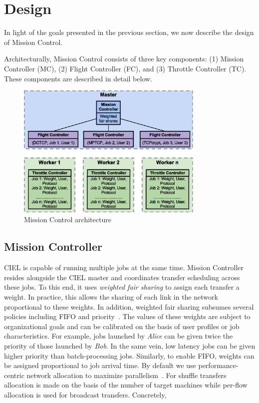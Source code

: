 \documentclass[a4paper,12pt,twoside,openright]{report}
\begin{document}
\section{Design}
In light of the goals presented in the previous section, we now describe the
design of Mission Control.

Architecturally, Mission Control consists of three key components: (1) Mission
Controller (MC), (2) Flight Controller (FC), and (3) Throttle Controller (TC).
These components are described in detail below.

\begin{figure}[h!]
  \centering
    \includegraphics[width=0.8\textwidth]{MissionControl.eps}
    \caption{Mission Control architecture}
    \label{chap:design:fig:missioncontrol}
\end{figure}

\subsection{Mission Controller}
CIEL is capable of running multiple jobs at the same time. Mission Controller
resides alongside the CIEL master and coordinates transfer scheduling across
these jobs. To this end, it uses \emph{weighted fair sharing} to assign each
transfer a weight. In practice, this allows the sharing of each link in the
network proportional to these weights. In addition, weighted fair sharing
subsumes several policies including FIFO and priority~\cite{Chowdhury:2011:MDT}.
The values of these weights are subject to organizational goals and can be
calibrated on the basis of user profiles or job characteristics. For example,
jobs launched by \emph{Alice} can be given twice the priority of those launched
by \emph{Bob}. In the same vein, low latency jobs can be given higher priority
than batch-processing jobs. Similarly, to enable FIFO, weights can be assigned
proportional to job arrival time. By default we use performance-centric network
allocation to maximize parallelism~\cite{Kumar:2012:ACF}. For shuffle transfers
allocation is made on the basis of the number of target machines while per-flow
allocation is used for broadcast transfers. Concretely,
\end{document}
